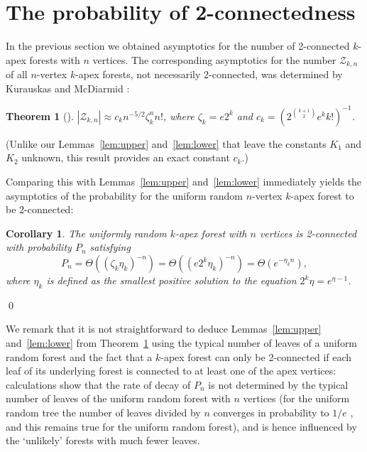 \documentclass[a4paper]{article}
\newcommand{\Z}{\mathcal{Z}}
\newcommand{\A}{\mathcal{A}}
\newtheorem{theorem}[lemma]{Theorem}
\newtheorem{corollary}[lemma]{Corollary}
\theoremstyle{remark}
\begin{document}
\section{The probability of 2-connectedness} \label{sec 2 conn}

In the previous section we obtained asymptotics for the number of 2-connected $k$-apex forests with $n$ vertices. The corresponding asymptotics for the number $\Z_{k,n}$  of all $n$-vertex $k$-apex forests, not necessarily 2-connected, was determined by Kurauskas and McDiarmid \cite{KurMcDRan}:

\begin{theorem}[\cite{KurMcDRan}]\label{KMtheorem}
	$|\Z_{k,n}| \approx c_k n^{-5/2} \zeta_k^{n}n!$, where $\zeta_k=e2^k$ and $c_k = \left( 2^{k+1 \choose 2}e^k k! \right)^{-1}$.
\end{theorem}

(Unlike our Lemmas~\ref{lem:upper} and~\ref{lem:lower} that leave the constants $K_1$ and $K_2$  unknown, this result provides an exact constant $c_k$.)

Comparing this with Lemmas~\ref{lem:upper} and~\ref{lem:lower} immediately yields the asymptotics of the probability for the uniform random $n$-vertex $k$-apex forest to be 2-connected:

\begin{corollary}
The uniformly random  $k$-apex forest with $n$ vertices is 2-connected with probability $P_n$ satisfying
$$P_n = \Theta(( \zeta_k \eta_k)^{-n}) = \Theta(( e2^k \eta_k)^{-n}) = \Theta(e^{-\eta_kn}),$$
where $\eta_k$ is defined as the smallest positive solution to the equation $2^k \eta = e^{\eta-1}$.
\end{corollary} \qed

We remark that it is not straightforward to deduce Lemmas~\ref{lem:upper} and~\ref{lem:lower} from Theorem~\ref{KMtheorem} using  the typical number of leaves of a uniform random forest and the fact that a $k$-apex forest can only be 2-connected if each leaf of its underlying forest is connected to at least one of the apex vertices: calculations show that the rate of decay of $P_n$ is not determined by the typical number of leaves of the uniform random forest with $n$ vertices (for the uniform random tree the number of leaves divided by $n$ converges in probability to $1/e$ \cite{GolSho}, and this remains true for the uniform random forest), and is hence influenced by the `unlikely' forests with much fewer leaves. 
\end{document}
